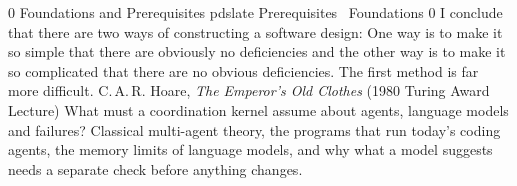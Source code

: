 
\makeatletter
\expandafter\def\csname pdchapternumberofprereq\endcsname{0}
\expandafter\def\csname pdchaptertitleofprereq\endcsname{Foundations and Prerequisites}
\expandafter\def\csname pdchaptercolorofprereq\endcsname{pdslate}
\expandafter\def\csname pdchapterpartlabelofprereq\endcsname{Prerequisites \textperiodcentered\ Foundations}
\expandafter\def\csname pdchapterpartindexofprereq\endcsname{0}
\expandafter\def\csname pdchapterepigraphofprereq\endcsname{I conclude that there are two ways of constructing a software design: One way is to make it so simple that there are obviously no deficiencies and the other way is to make it so complicated that there are no obvious deficiencies. The first method is far more difficult.}
\expandafter\def\csname pdchapterepigraphsourceofprereq\endcsname{C.\,A.\,R. Hoare, \emph{The Emperor's Old Clothes} (1980 Turing Award Lecture)}
\expandafter\def\csname pdchapterquestionofprereq\endcsname{What must a coordination kernel assume about agents, language models and failures?}
\expandafter\def\csname pdchapteronelineofprereq\endcsname{Classical multi-agent theory, the programs that run today's coding agents, the memory limits of language models, and why what a model suggests needs a separate check before anything changes.}

\providecommand{\pdchapteropeningprereq}{%
  \pdbookrail{Theoretical Foundations}{An interrupted repair creates questions about
    actions, commitments and observations. This chapter develops the distinctions
    needed to answer them, using small examples before the general statements.
    Its final result shows what the admission check and a recovery record
    must provide.}%
}

